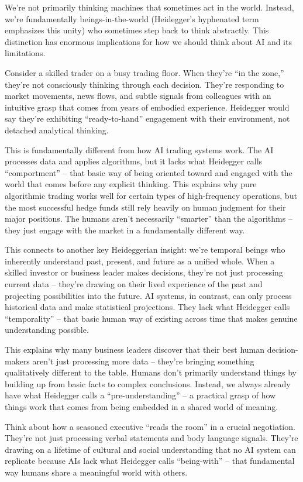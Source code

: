 \documentclass[
  Letterpaper,
]{scrbook}
\begin{document}
We're not primarily thinking machines that sometimes act in the world.
Instead, we're fundamentally beings-in-the-world (Heidegger's hyphenated
term emphasizes this unity) who sometimes step back to think abstractly.
This distinction has enormous implications for how we should think about
AI and its limitations.

Consider a skilled trader on a busy trading floor. When they're ``in the
zone,'' they're not consciously thinking through each decision. They're
responding to market movements, news flows, and subtle signals from
colleagues with an intuitive grasp that comes from years of embodied
experience. Heidegger would say they're exhibiting ``ready-to-hand''
engagement with their environment, not detached analytical thinking.

This is fundamentally different from how AI trading systems work. The AI
processes data and applies algorithms, but it lacks what Heidegger calls
``comportment'' -- that basic way of being oriented toward and engaged
with the world that comes before any explicit thinking. This explains
why pure algorithmic trading works well for certain types of
high-frequency operations, but the most successful hedge funds still
rely heavily on human judgment for their major positions. The humans
aren't necessarily ``smarter'' than the algorithms -- they just engage
with the market in a fundamentally different way.

This connects to another key Heideggerian insight: we're temporal beings
who inherently understand past, present, and future as a unified whole.
When a skilled investor or business leader makes decisions, they're not
just processing current data -- they're drawing on their lived
experience of the past and projecting possibilities into the future. AI
systems, in contrast, can only process historical data and make
statistical projections. They lack what Heidegger calls ``temporality''
-- that basic human way of existing across time that makes genuine
understanding possible.

This explains why many business leaders discover that their best human
decision-makers aren't just processing more data -- they're bringing
something qualitatively different to the table. Humans don't primarily
understand things by building up from basic facts to complex
conclusions. Instead, we always already have what Heidegger calls a
``pre-understanding'' -- a practical grasp of how things work that comes
from being embedded in a shared world of meaning.

Think about how a seasoned executive ``reads the room'' in a crucial
negotiation. They're not just processing verbal statements and body
language signals. They're drawing on a lifetime of cultural and social
understanding that no AI system can replicate because AIs lack what
Heidegger calls ``being-with'' -- that fundamental way humans share a
meaningful world with others.
\end{document}
